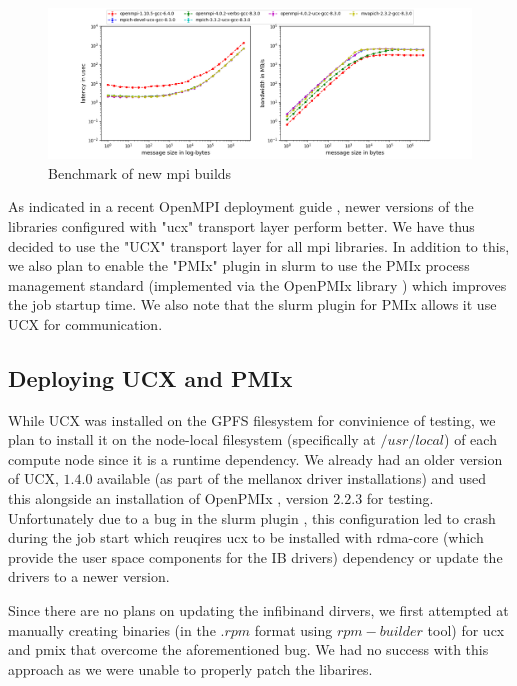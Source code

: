 \documentclass[sigconf,authordraft]{acmart}
\begin{document}
\begin{figure}[h]
	\centering
	\includegraphics[width=\linewidth]{new_mpi}
	\caption{Benchmark of new mpi builds}
	\label{fig:newmpi}
\end{figure}

As indicated in a recent OpenMPI deployment guide \cite{openmpi_deployment_tuning}, newer versions of the libraries configured with "ucx" transport layer perform better. We have thus  decided to use the "UCX" transport layer for all mpi libraries. In addition to this, we also plan to enable the "PMIx" plugin \cite{slurm_pmix_sc17,slurm_pmix_2019} in slurm to use the PMIx process management standard \cite{pmix,pmix_website} (implemented via the OpenPMIx library \cite{openpmix_website}) which improves the job startup time. We also note that the slurm plugin for PMIx allows it use UCX for communication.

\subsection{Deploying UCX and PMIx}
While UCX was installed on the GPFS filesystem for convinience of testing, we plan to install it on the node-local filesystem (specifically at $/usr/local$) of each compute node since it is a runtime dependency. We already had an older version of UCX, $1.4.0$ available (as part of the mellanox driver installations) and used this alongside an installation of OpenPMIx \cite{openpmix_website}, version $2.2.3$ for testing. Unfortunately due to a bug in the slurm plugin \cite{slurm_ucx_bug}, this configuration led to crash during the job start which reuqires ucx to be installed with rdma-core \cite{rdmacore_repository}(which provide the user space components for the IB drivers) dependency or update the drivers to a newer version.

Since there are no plans on updating the infibinand dirvers, we first attempted at manually creating binaries (in the $.rpm$ format using $rpm-builder$ tool) for ucx and pmix that overcome the aforementioned bug. We had no success with this approach as we were unable to properly patch the libarires.
\end{document}
